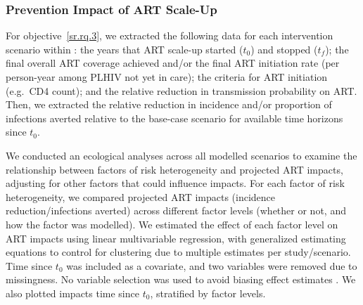 \subsubsection{Prevention Impact of ART Scale-Up}\label{sr.meth.data.api}
For objective~\ref{sr.rq.3}, we extracted
the following data for each intervention scenario within :
the years that ART scale-up started ($t_0$) and stopped ($t_f$);
the final overall ART coverage achieved and/or
the final ART initiation rate (per person-year among PLHIV not yet in care);
the criteria for ART initiation (e.g.\ CD4 count); and
the relative reduction in transmission probability on ART.
Then, we extracted the
relative reduction in incidence and/or proportion of infections averted
relative to the base-case scenario for available time horizons since $t_0$.
\par
We conducted an ecological analyses across all modelled scenarios to examine the relationship between
factors of risk heterogeneity and projected ART impacts,
adjusting for other factors that could influence impacts.
For each factor of risk heterogeneity, we compared
projected ART impacts (incidence reduction/infections averted)
across different factor levels (whether or not, and how the factor was modelled).
We estimated the effect of each factor level on ART impacts
using linear multivariable regression, with generalized estimating equations \cite{Hojsgaard2006}
to control for clustering due to multiple estimates per study/scenario.
Time since $t_0$ was included as a covariate, and two variables were removed due to missingness.
No variable selection was used to avoid biasing effect estimates \cite{Harrell2001}.
We also plotted impacts \vs time since $t_0$, stratified by factor levels.
